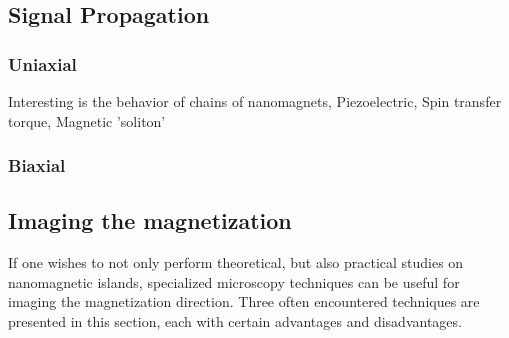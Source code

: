 \documentclass[10pt,a4paper]{article}
\begin{document}
\subsection{Signal Propagation}
\subsubsection{Uniaxial}


Interesting is the behavior of chains of nanomagnets, 
Piezoelectric,
Spin transfer torque,
Magnetic 'soliton'

\subsubsection{Biaxial}

\subsection{Imaging the magnetization}
If one wishes to not only perform theoretical, but also practical studies on nanomagnetic islands, specialized microscopy techniques can be useful for imaging the magnetization direction. Three often encountered techniques are presented in this section, each with certain advantages and disadvantages.
\end{document}
